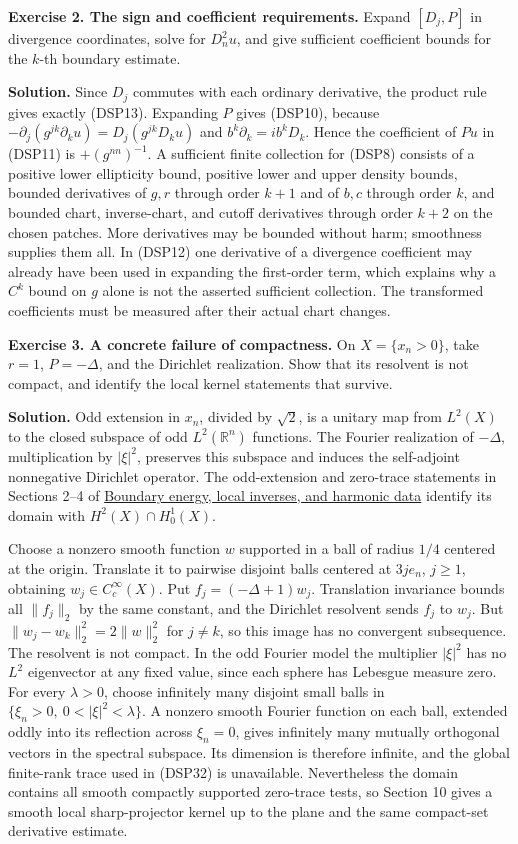 \documentclass[
  11pt,
]{article}
\begin{document}
\textbf{Exercise 2. The sign and coefficient requirements.} Expand
\([D_j,P]\) in divergence coordinates, solve for \(D_n^2u\), and give
sufficient coefficient bounds for the \(k\)-th boundary estimate.

\textbf{Solution.} Since \(D_j\) commutes with each ordinary derivative,
the product rule gives exactly (DSP13). Expanding \(P\) gives (DSP10),
because \(-\partial_j(g^{jk}\partial_ku)=D_j(g^{jk}D_ku)\) and
\(b^k\partial_k=ib^kD_k\). Hence the coefficient of \(Pu\) in (DSP11) is
\(+(g^{nn})^{-1}\). A sufficient finite collection for (DSP8) consists
of a positive lower ellipticity bound, positive lower and upper density
bounds, bounded derivatives of \(g,r\) through order \(k+1\) and of
\(b,c\) through order \(k\), and bounded chart, inverse-chart, and
cutoff derivatives through order \(k+2\) on the chosen patches. More
derivatives may be bounded without harm; smoothness supplies them all.
In (DSP12) one derivative of a divergence coefficient may already have
been used in expanding the first-order term, which explains why a
\(C^k\) bound on \(g\) alone is not the asserted sufficient collection.
The transformed coefficients must be measured after their actual chart
changes.

\textbf{Exercise 3. A concrete failure of compactness.} On
\(X=\{x_n>0\}\), take \(r=1\), \(P=-\Delta\), and the Dirichlet
realization. Show that its resolvent is not compact, and identify the
local kernel statements that survive.

\textbf{Solution.} Odd extension in \(x_n\), divided by \(\sqrt2\), is a
unitary map from \(L^2(X)\) to the closed subspace of odd
\(L^2(\mathbb R^n)\) functions. The Fourier realization of \(-\Delta\),
multiplication by \(|\xi|^2\), preserves this subspace and induces the
self-adjoint nonnegative Dirichlet operator. The odd-extension and
zero-trace statements in Sections 2--4 of
\href{second-order-boundary.pdf}{Boundary energy, local inverses, and
harmonic data} identify its domain with \(H^2(X)\cap H_0^1(X)\).

Choose a nonzero smooth function \(w\) supported in a ball of radius
\(1/4\) centered at the origin. Translate it to pairwise disjoint balls
centered at \(3je_n\), \(j\geq1\), obtaining \(w_j\in C_c^\infty(X)\).
Put \(f_j=(-\Delta+1)w_j\). Translation invariance bounds all
\(\|f_j\|_2\) by the same constant, and the Dirichlet resolvent sends
\(f_j\) to \(w_j\). But \(\|w_j-w_k\|_2^2=2\|w\|_2^2\) for \(j\ne k\),
so this image has no convergent subsequence. The resolvent is not
compact. In the odd Fourier model the multiplier \(|\xi|^2\) has no
\(L^2\) eigenvector at any fixed value, since each sphere has Lebesgue
measure zero. For every \(\lambda>0\), choose infinitely many disjoint
small balls in \(\{\xi_n>0,\ 0<|\xi|^2<\lambda\}\). A nonzero smooth
Fourier function on each ball, extended oddly into its reflection across
\(\xi_n=0\), gives infinitely many mutually orthogonal vectors in the
spectral subspace. Its dimension is therefore infinite, and the global
finite-rank trace used in (DSP32) is unavailable. Nevertheless the
domain contains all smooth compactly supported zero-trace tests, so
Section 10 gives a smooth local sharp-projector kernel up to the plane
and the same compact-set derivative estimate.
\end{document}
